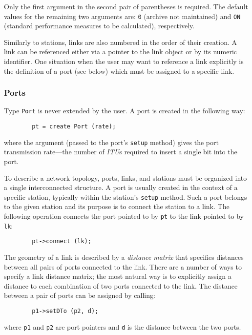 Only the first argument in the second pair of parentheses is required.
The default values for the remaining two arguments are: {\tt 0} (archive
not maintained) and {\tt ON} (standard performance measures to be
calculated), respectively.

Similarly to stations, links are also numbered in the order of their
creation.
A link can be referenced either via a pointer to the link object or by its
numeric identifier.
One situation when the user may want to reference a link explicitly is
the definition of a port (see below) which must be assigned to a specific
link.

\subsubsection{Ports}

Type {\tt Port} is never extended by the user.
A port is created in the following way:
{\small
\begin{verbatim}
        pt = create Port (rate);
\end{verbatim} }
\noindent
where the argument (passed to the port's {\tt setup} method) gives
the port transmission rate---the number of {\em ITU\/}s required to insert a
single bit into the port.

To describe a network topology, ports, links, and stations must be organized
into a single interconnected structure.
A port is usually created in the context of a specific station, typically
within the station's {\tt setup} method.
Such a port belongs to the given station and
its purpose is to connect the station to a link.
The following operation connects the port pointed to by
{\tt pt} to the link pointed to by {\tt lk}:
{\small
\begin{verbatim}
        pt->connect (lk);
\end{verbatim} }

The geometry of a link is described by a {\em distance matrix\/} that specifies
distances between all pairs of ports connected to the link.
There are a number of ways to specify a link distance matrix; the most
natural way is to explicitly assign a distance to each combination of
two ports connected to the link.
The distance between a pair of ports can be assigned by calling:
{\small
\begin{verbatim}
        p1->setDTo (p2, d);
\end{verbatim} }
\noindent
where {\tt p1} and {\tt p2} are port pointers and {\tt d} is the distance
between the two ports.

